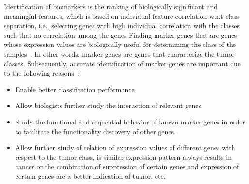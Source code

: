 \hspace*{3.5mm} Identification of biomarkers is the ranking of biologically significant and meaningful features, which is based on individual feature correlation w.r.t class separation, i.e., selecting genes with high individual correlation with the classes such that no correlation among the genes Finding marker genes that are genes whose expression values are biologically useful for determining the class of the samples~\cite{lu2003cancer}. In other words, marker genes are genes that characterize the tumor classes. Subsequently, accurate identification of marker genes are important due to the following reasons~\cite{lu2003cancer}:

\begin{itemize}[noitemsep]
    \item Enable better classification performance
    \item Allow biologists further study the interaction of relevant genes 
    \item Study the functional and sequential behavior of known marker genes in order to facilitate the functionality discovery of other genes.
    \item Allow further study of relation of expression values of different genes with respect to the tumor class, is similar expression pattern always results in cancer or the combination of suppression of certain genes and expression of certain genes are a better indication of tumor, etc.
\end{itemize}


